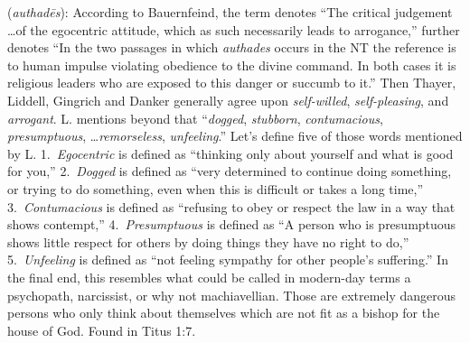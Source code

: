 \item[Machiavellian,]

(\textit{authadēs}):
According to Bauernfeind, the term denotes ``The critical judgement \ldots of the egocentric attitude, which as such necessarily leads to arrogance,'' further denotes ``In the two passages in which \emph{authades} occurs in the NT the reference is to human impulse violating obedience to the divine command. In both cases it is religious leaders who are exposed to this danger or succumb to it.'' Then Thayer, Liddell, Gingrich and Danker generally agree upon \emph{self-willed}, \emph{self-pleasing}, and \emph{arrogant}. L. mentions beyond that ``\emph{dogged}, \emph{stubborn}, \emph{contumacious}, \emph{presumptuous}, \ldots \emph{remorseless}, \emph{unfeeling}.'' Let's define five of those words mentioned by L.
1.~\emph{Egocentric} is defined as ``thinking only about yourself and what is good for you,''
2.~\emph{Dogged} is defined as ``very determined to continue doing something, or trying to do something, even when this is difficult or takes a long time,''
3.~\emph{Contumacious} is defined as ``refusing to obey or respect the law in a way that shows contempt,''
4.~\emph{Presumptuous} is defined as ``A person who is presumptuous shows little respect for others by doing things they have no right to do,''
5.~\emph{Unfeeling} is defined as ``not feeling sympathy for other people's suffering.''
In the final end, this resembles what could be called in modern-day terms a psychopath, narcissist, or why not machiavellian. Those are extremely dangerous persons who only think about themselves which are not fit as a bishop for the house of God.
Found in Titus 1:7.

